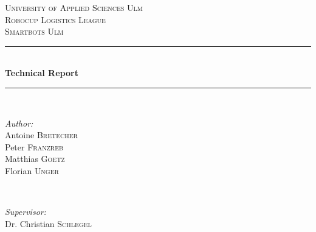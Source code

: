 \documentclass[12pt]{article}
\begin{document}
\begin{titlepage}

\newcommand{\HRule}{\rule{\linewidth}{0.5mm}} %

\center %
 

\textsc{\LARGE University of Applied Sciences Ulm}\\[1.5cm] %
\textsc{\Large Robocup Logistics League}\\[0.5cm] %
\textsc{\large Smartbots Ulm}\\[0.5cm] %


\HRule \\[0.4cm]
{ \huge \bfseries Technical Report}\\[0.4cm] %
\HRule \\[1.5cm]
 

\begin{minipage}{0.4\textwidth}
\begin{flushleft} \large
\emph{Author:}\\
Antoine \textsc{Bretecher} \\%
Peter \textsc{Franzreb} \\%
Matthias \textsc{Goetz} \\%
Florian \textsc{Unger} \\%
\end{flushleft}
\end{minipage}
~
\begin{minipage}{0.4\textwidth}
\begin{flushright} \large
\emph{Supervisor:} \\
Dr. Christian \textsc{Schlegel} %
\end{flushright}
\end{minipage}\\[2cm]


\end{titlepage}
\end{document}
